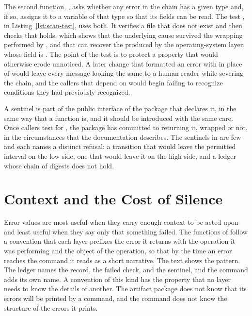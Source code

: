 The second function, , asks whether any error in the chain has a given type and, if so, assigns it to a variable of that type so that its fields can be read. The test , in Listing~\ref{lst:scan-test}, uses both. It verifies a file that does not exist and then checks that  holds, which shows that the underlying cause survived the wrapping performed by , and that  can recover the  produced by the operating-system layer, whose  field is . The point of the test is to protect a property that would otherwise erode unnoticed. A later change that formatted an error with  in place of  would leave every message looking the same to a human reader while severing the chain, and the callers that depend on  would begin failing to recognize conditions they had previously recognized.

A sentinel is part of the public interface of the package that declares it, in the same way that a function is, and it should be introduced with the same care. Once callers test for , the package has committed to returning it, wrapped or not, in the circumstances that the documentation describes. The sentinels in \golab{} are few and each names a distinct refusal: a transition that would leave the permitted interval on the low side, one that would leave it on the high side, and a ledger whose chain of digests does not hold.

\section{Context and the Cost of Silence}

Error values are most useful when they carry enough context to be acted upon and least useful when they say only that something failed. The functions of \golab{} follow a convention that each layer prefixes the error it returns with the operation it was performing and the object of the operation, so that by the time an error reaches the command it reads as a short narrative. The text  shows the pattern. The ledger names the record, the failed check, and the sentinel, and the command adds its own name. A convention of this kind has the property that no layer needs to know the details of another. The artifact package does not know that its errors will be printed by a command, and the command does not know the structure of the errors it prints.

